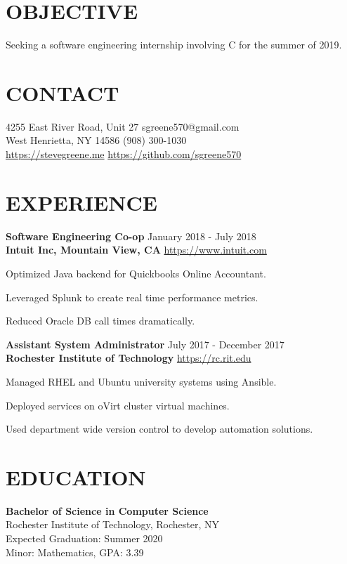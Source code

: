 \documentclass[line, margin, 11pt]{res}
\begin{document}

\begin{resume}

\section{OBJECTIVE}
Seeking a software engineering internship involving C for the summer of 2019.

\section {CONTACT}
4255 East River Road, Unit 27 \hfill sgreene570@gmail.com \\
West Henrietta, NY 14586 \hfill (908) 300-1030 \\
\url{https://stevegreene.me} \hfill \url{https://github.com/sgreene570}

\section{EXPERIENCE}
{\bf \large{Software Engineering Co-op}} \hfill January 2018 - July 2018 \\
{\bf Intuit Inc, Mountain View, CA} \hfill \url{https://www.intuit.com}
\begin{compactitem}
    \item Optimized Java backend for Quickbooks Online Accountant.
    \item Leveraged Splunk to create real time performance metrics.
    \item Reduced Oracle DB call times dramatically.
\end{compactitem}

{\bf \large{Assistant System Administrator}} \hfill July 2017 - December 2017 \\
{\bf Rochester Institute of Technology} \hfill \url{https://rc.rit.edu}
\begin{compactitem}
    \item Managed RHEL and Ubuntu university systems using Ansible.
    \item Deployed services on oVirt cluster virtual machines.
    \item Used department wide version control to develop automation solutions.
\end{compactitem}

\section{EDUCATION}
{\bf Bachelor of Science in Computer Science} \\
Rochester Institute of Technology, Rochester, NY \\
Expected Graduation: Summer 2020 \\
Minor: Mathematics, GPA: 3.39



\end{resume}
\end{document}
